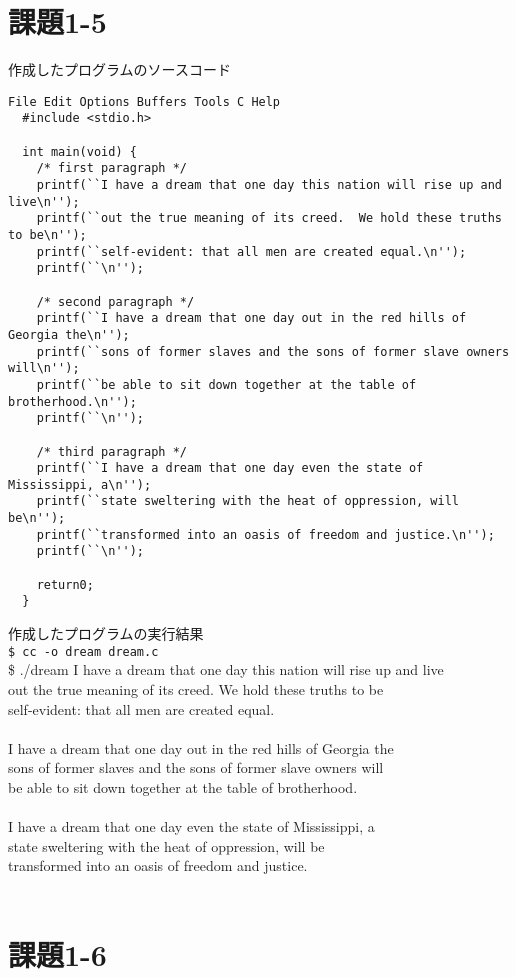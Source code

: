 \documentclass[12pt,a4paper]{jarticle}
\begin{document}
\section{課題1-5}
作成したプログラムのソースコード\\
\begin{lstlisting}[basicstyle=\ttfamily\footnotesize,frame=single]
  File Edit Options Buffers Tools C Help
  #include <stdio.h>

  int main(void) {
    /* first paragraph */
    printf(``I have a dream that one day this nation will rise up and live\n'');
    printf(``out the true meaning of its creed.  We hold these truths to be\n'');
    printf(``self-evident: that all men are created equal.\n'');
    printf(``\n'');
    
    /* second paragraph */
    printf(``I have a dream that one day out in the red hills of Georgia the\n'');
    printf(``sons of former slaves and the sons of former slave owners will\n'');
    printf(``be able to sit down together at the table of brotherhood.\n'');
    printf(``\n'');

    /* third paragraph */
    printf(``I have a dream that one day even the state of Mississippi, a\n'');
    printf(``state sweltering with the heat of oppression, will be\n'');
    printf(``transformed into an oasis of freedom and justice.\n'');
    printf(``\n'');

    return0;
  }

\end{lstlisting}
作成したプログラムの実行結果\\
\verb|$ cc -o dream dream.c|\\
\$ ./dream
I have a dream that one day this nation will rise up and live\\
out the true meaning of its creed.  We hold these truths to be\\
self-evident: that all men are created equal.\\
\\
I have a dream that one day out in the red hills of Georgia the\\
sons of former slaves and the sons of former slave owners will\\
be able to sit down together at the table of brotherhood.\\
\\
I have a dream that one day even the state of Mississippi, a\\
state sweltering with the heat of oppression, will be\\
transformed into an oasis of freedom and justice.\\
\\


\section{課題1-6}
\end{document}
